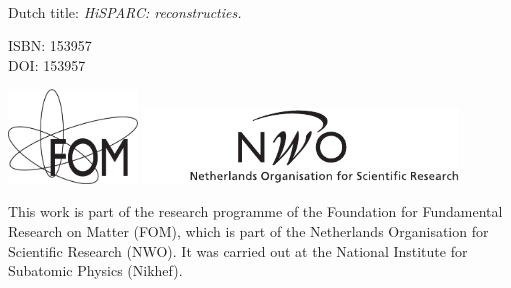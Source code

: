 \thispagestyle{empty}

\begin{center}

\vspace*{2cm}

\\[1em]
\end{center}

\clearpage

\vspace*{\fill}

\noindent
Dutch title: \emph{HiSPARC: reconstructies.}

\vspace{1cm}

\noindent
ISBN: 153957 \\
DOI: 153957

\vspace{3cm}

\includegraphics[height=2.5cm]{figures/logo_FOM_zw}
\hfill
\includegraphics[height=2cm]{figures/logo_NWO_zw}

\vspace{.5cm}

\noindent
This work is part of the research programme of the Foundation for
Fundamental Research on Matter (FOM), which is part of the Netherlands
Organisation for Scientific Research (NWO).  It was carried out at the
National Institute for Subatomic Physics (Nikhef).



\cleardoublepage
\thispagestyle{empty}

